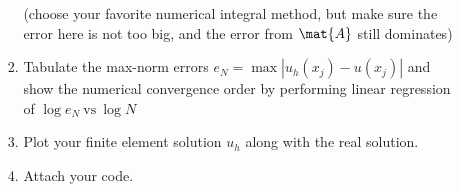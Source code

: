 \documentclass{article}
\begin{document}
\begin{enumerate}
\begin{enumerate}
\begin{enumerate}
						(choose your favorite numerical integral method,
						but make sure the error here is not too big,
						and the error from $\mat{A}$ still dominates)
					\item Tabulate the max-norm errors $e_N = \max\left|u_h(x_j) - u(x_j)\right|$
						and show the numerical convergence order by performing linear regression of
						$\log{e_N} \mathrm{\ vs\ } \log{N}$
					\item Plot your finite element solution $u_h$ along with the real solution.
					\item Attach your code.
				\end{enumerate}
		\end{enumerate}
\end{enumerate}
\end{document}
